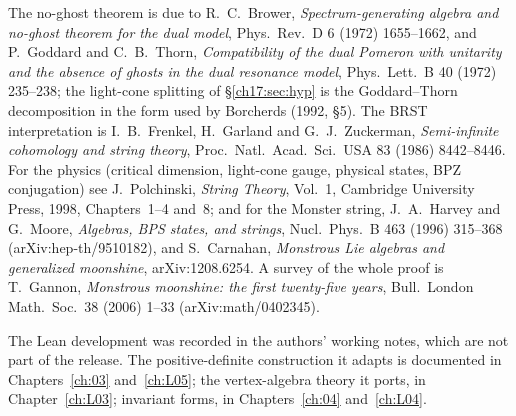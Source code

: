 The no-ghost theorem is due to R.~C.~Brower, \emph{Spectrum-generating algebra and no-ghost theorem for the dual model},
Phys.\ Rev.\ D 6 (1972) 1655--1662, and P.~Goddard and C.~B.~Thorn, \emph{Compatibility of the dual Pomeron with unitarity and
the absence of ghosts in the dual resonance model}, Phys.\ Lett.\ B 40 (1972) 235--238; the light-cone splitting of
\S\ref{ch17:sec:hyp} is the Goddard--Thorn decomposition in the form used by Borcherds (1992, \S5).  The BRST
interpretation is I.~B.~Frenkel, H.~Garland and G.~J.~Zuckerman, \emph{Semi-infinite cohomology and string theory}, Proc.\
Natl.\ Acad.\ Sci.\ USA 83 (1986) 8442--8446.  For the physics (critical dimension, light-cone gauge, physical states,
BPZ conjugation) see J.~Polchinski, \emph{String Theory}, Vol.~1, Cambridge University Press, 1998, Chapters~1--4 and~8; and
for the Monster string, J.~A.~Harvey and G.~Moore, \emph{Algebras, BPS states, and strings}, Nucl.\ Phys.\ B 463 (1996)
315--368 (arXiv:hep-th/9510182), and S.~Carnahan, \emph{Monstrous Lie algebras and generalized moonshine}, arXiv:1208.6254.
A survey of the whole proof is T.~Gannon, \emph{Monstrous moonshine: the first twenty-five years}, Bull.\ London Math.\ Soc.\
38 (2006) 1--33 (arXiv:math/0402345).

The Lean development was recorded in the authors' working notes, which are not part of the release.  The positive-definite construction it adapts is documented in
Chapters~\ref{ch:03} and~\ref{ch:L05}; the vertex-algebra theory it ports, in Chapter~\ref{ch:L03}; invariant forms, in
Chapters~\ref{ch:04} and~\ref{ch:L04}.

\endgroup

